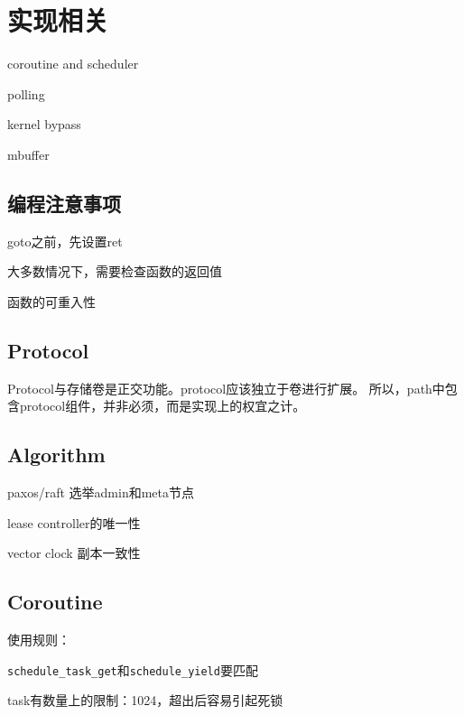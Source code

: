 \chapter{实现相关}

\begin{compactitem}
    \item coroutine and scheduler
    \item polling 
    \item kernel bypass
    \item mbuffer
\end{compactitem}

\section{编程注意事项}

\begin{compactitem}
\item goto之前，先设置ret
\item 大多数情况下，需要检查函数的返回值
\item 函数的可重入性
\end{compactitem}

\section{Protocol}

Protocol与存储卷是正交功能。protocol应该独立于卷进行扩展。
所以，path中包含protocol组件，并非必须，而是实现上的权宜之计。

\section{Algorithm}

\begin{compactitem}
    \item paxos/raft 选举admin和meta节点
    \item lease controller的唯一性
    \item vector clock 副本一致性
\end{compactitem}

\section{Coroutine}

使用规则：
\begin{compactitem}
    \item \verb|schedule_task_get|和\verb|schedule_yield|要匹配
    \item task有数量上的限制：1024，超出后容易引起死锁
\end{compactitem}

